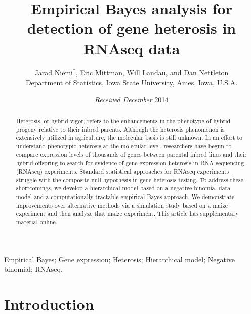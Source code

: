 \documentclass[useAMS,usenatbib,referee]{biom}
\title{Empirical Bayes analysis for detection of gene heterosis in RNAseq data}
\author{Jarad Niemi$^*$\email{niemi@iastate.edu}, 
Eric Mittman, 
Will Landau, and 
Dan Nettleton \\
Department of Statistics, Iowa State University, Ames, Iowa, U.S.A.}
\begin{document}
\date{{\it Received December} 2014} 

\pagerange{\pageref{firstpage}--\pageref{lastpage}} 

\label{firstpage}

\begin{abstract}
Heterosis, or hybrid vigor, refers to the enhancements in the phenotype of hybrid progeny relative to their inbred parents. Although the heterosis phenomenon is extensively utilized in agriculture, the molecular basis is still unknown. In an effort to understand phenotypic heterosis at the molecular level, researchers have begun to compare expression levels of thousands of genes between parental inbred lines and their hybrid offspring to search for evidence of gene expression heterosis in RNA sequencing (RNAseq) experiments. Standard statistical approaches for RNAseq experiments struggle with the composite null hypothesis in gene heterosis testing. To address these shortcomings, we develop a hierarchical model based on a negative-binomial data model and a computationally tractable empirical Bayes approach. We demonstrate improvements over alternative methods via a simulation study based on a maize experiment and then analyze that maize experiment. This article has supplementary material online.
\end{abstract}

\begin{keywords}
Empirical Bayes; Gene expression; Heterosis; Hierarchical model; Negative binomial; RNAseq.
\end{keywords}

\maketitle


\section{Introduction}
\label{s:intro}
\end{document}
